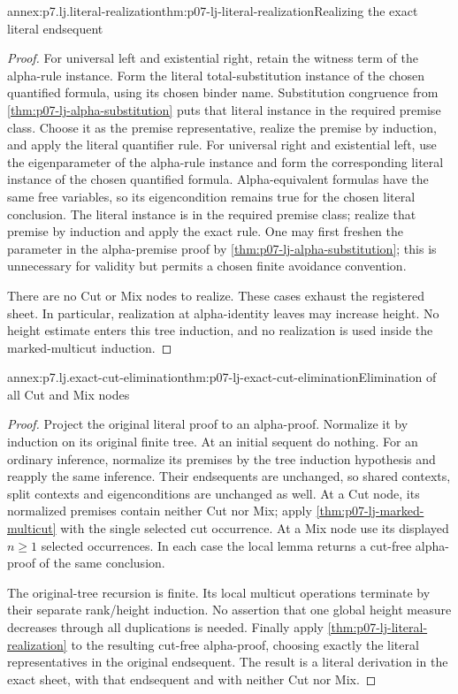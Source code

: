 \begin{annexitem}{annex:p7.lj.literal-realization}{thm:p07-lj-literal-realization}{Realizing the exact literal endsequent}
\begin{proof}
For universal left and existential right, retain the witness term of
the alpha-rule instance.  Form the literal total-substitution instance
of the chosen quantified formula, using its chosen binder name.
Substitution congruence from
\ref{thm:p07-lj-alpha-substitution} puts that literal instance in the
required premise class.  Choose it as the premise representative,
realize the premise by induction, and apply the literal quantifier rule.
For universal right and existential left, use the eigenparameter of
the alpha-rule instance and form the corresponding literal instance
of the chosen quantified formula.  Alpha-equivalent formulas have the
same free variables, so its eigencondition remains true for the chosen
literal conclusion.  The literal instance is in the required premise
class; realize that premise by induction and apply the exact rule.
One may first freshen the parameter in the alpha-premise proof by
\ref{thm:p07-lj-alpha-substitution}; this is unnecessary for validity
but permits a chosen finite avoidance convention.

There are no Cut or Mix nodes to realize.  These cases exhaust the
registered sheet.  In particular, realization at alpha-identity leaves
may increase height.  No height estimate enters this tree induction,
and no realization is used inside the marked-multicut induction.
\end{proof}
\end{annexitem}

\begin{annexitem}{annex:p7.lj.exact-cut-elimination}{thm:p07-lj-exact-cut-elimination}{Elimination of all Cut and Mix nodes}
\begin{proof}
Project the original literal proof to an alpha-proof.  Normalize it by
induction on its original finite tree.  At an initial sequent do nothing.
For an ordinary inference, normalize its premises by the tree induction
hypothesis and reapply the same inference.  Their endsequents are
unchanged, so shared contexts, split contexts and eigenconditions are
unchanged as well.  At a Cut node, its normalized premises contain
neither Cut nor Mix; apply \ref{thm:p07-lj-marked-multicut} with the
single selected cut occurrence.  At a Mix node use its displayed
\(n\geq1\) selected occurrences.  In each case the local lemma
returns a cut-free alpha-proof of the same conclusion.

The original-tree recursion is finite.  Its local multicut operations
terminate by their separate rank/height induction.  No assertion that
one global height measure decreases through all duplications is needed.
Finally apply \ref{thm:p07-lj-literal-realization} to the resulting
cut-free alpha-proof, choosing exactly the literal representatives in
the original endsequent.  The result is a literal derivation in the
exact sheet, with that endsequent and with neither Cut nor Mix.
\end{proof}
\end{annexitem}

